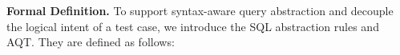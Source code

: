 \documentclass[sigconf,review,anonymous]{acmart}
\begin{document}





\textbf{Formal Definition.} To support syntax-aware query abstraction and decouple the logical intent of a test case, we introduce the SQL abstraction rules and AQT. 
They are defined as follows:
\vspace{-0.4cm}
\end{document}
